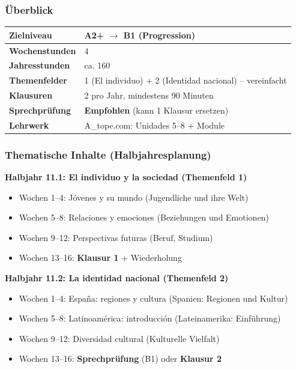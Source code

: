 \documentclass[10pt,a4paper]{article}
\begin{document}
\subsubsection{Überblick}

\begin{center}
\small
\begin{tabular}{|p{4cm}|p{9cm}|}
\hline
\rowcolor{lightspaet}
\textbf{Zielniveau} & A2+ $\rightarrow$ B1 (Progression) \\
\hline
\textbf{Wochenstunden} & 4 \\
\hline
\textbf{Jahresstunden} & ca. 160 \\
\hline
\textbf{Themenfelder} & 1 (El individuo) + 2 (Identidad nacional) -- vereinfacht \\
\hline
\textbf{Klausuren} & 2 pro Jahr, mindestens 90 Minuten \\
\hline
\textbf{Sprechprüfung} & \textbf{Empfohlen} (kann 1 Klausur ersetzen) \\
\hline
\textbf{Lehrwerk} & A\_tope.com: Unidades 5--8 + Module \\
\hline
\end{tabular}
\end{center}

\subsubsection{Thematische Inhalte (Halbjahresplanung)}

\textbf{Halbjahr 11.1: El individuo y la sociedad (Themenfeld 1)}
\begin{itemize}[noitemsep]
\item Wochen 1--4: Jóvenes y su mundo (Jugendliche und ihre Welt)
\item Wochen 5--8: Relaciones y emociones (Beziehungen und Emotionen)
\item Wochen 9--12: Perspectivas futuras (Beruf, Studium)
\item Wochen 13--16: \textbf{Klausur 1} + Wiederholung
\end{itemize}

\textbf{Halbjahr 11.2: La identidad nacional (Themenfeld 2)}
\begin{itemize}[noitemsep]
\item Wochen 1--4: España: regiones y cultura (Spanien: Regionen und Kultur)
\item Wochen 5--8: Latinoamérica: introducción (Lateinamerika: Einführung)
\item Wochen 9--12: Diversidad cultural (Kulturelle Vielfalt)
\item Wochen 13--16: \textbf{Sprechprüfung} (B1) oder \textbf{Klausur 2}
\end{itemize}
\end{document}
